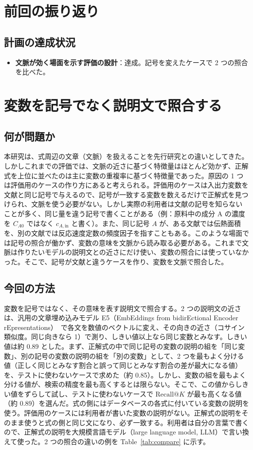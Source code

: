 \documentclass[a4j,dvipdfmx,10pt]{jresume}
\makeatletter
\newcommand{\rk}{\textrm{Recall@}K}
\makeatother
\begin{document}
\section{前回の振り返り}\label{sec:review}
\subsection{計画の達成状況}
\begin{itemize}[leftmargin=1.5em]
  \item \textbf{文脈が効く場面を示す評価の設計}：達成。記号を変えたケースで 2 つの照合を比べた。
\end{itemize}


\section{変数を記号でなく説明文で照合する}\label{sec:method}
\subsection{何が問題か}
本研究は、式周辺の文章（文脈）を扱えることを先行研究との違いとしてきた。しかしこれまでの評価では、文脈の近さに基づく特徴量はほとんど効かず、正解式を上位に並べたのは主に変数の重複率に基づく特徴量であった。原因の 1 つは評価用のケースの作り方にあると考えられる。評価用のケースは入出力変数を文献と同じ記号で与えるので、記号が一致する変数を数えるだけで正解式を見つけられ、文脈を使う必要がない。しかし実際の利用者は文献の記号を知らないことが多く、同じ量を違う記号で書くことがある（例：原料中の成分 A の濃度を $C_{A0}$ ではなく $c_{A,\mathrm{in}}$ と書く）。また、同じ記号 $A$ が、ある文献では伝熱面積を、別の文献では反応速度定数の頻度因子を指すこともある。このような場面では記号の照合が働かず、変数の意味を文脈から読み取る必要がある。これまで文脈は作りたいモデルの説明文との近さにだけ使い、変数の照合には使っていなかった。そこで、記号が文献と違うケースを作り、変数を文脈で照合した。

\subsection{今回の方法}
変数を記号ではなく、その意味を表す説明文で照合する。2 つの説明文の近さは、汎用の文章埋め込みモデル E5（EmbEddings from bidirEctional Encoder rEpresentations）~\citep{E5}で各文を数値のベクトルに変え、その向きの近さ（コサイン類似度。同じ向きなら 1）で測り、しきい値以上なら同じ変数とみなす。しきい値は約 0.89 とした。まず、正解式の中で同じ記号の変数の説明の組を「同じ変数」、別の記号の変数の説明の組を「別の変数」として、2 つを最もよく分ける値（正しく同じとみなす割合と誤って同じとみなす割合の差が最大になる値）を、テストに使わないケースで求めた（約 0.85）。しかし、変数の組を最もよく分ける値が、検索の精度を最も高くするとは限らない。そこで、この値からしきい値をずらして試し、テストに使わないケースで $\rk$ が最も高くなる値（約 0.89）を選んだ。式の側にはデータベースの各式に付いている変数の説明を使う。評価用のケースには利用者が書いた変数の説明がない。正解式の説明をそのまま使うと式の側と同じ文になり、必ず一致する。利用者は自分の言葉で書くので、正解式の説明を大規模言語モデル（large language model, LLM）で言い換えて使った。2 つの照合の違いの例を Table~\ref{tab:compare} に示す。
\end{document}
